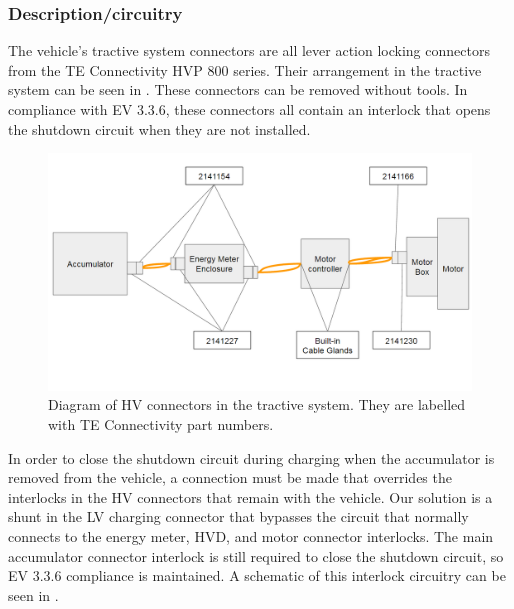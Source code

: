 \documentclass{article}
\begin{document}
\subsubsection{Description/circuitry}
The vehicle's tractive system connectors are all lever action locking connectors from the TE Connectivity HVP 800 series. Their arrangement in the tractive system can be seen in . These connectors can be removed without tools. In compliance with EV 3.3.6, these connectors all contain an interlock that opens the shutdown circuit when they are not installed. 

  \begin{figure}[H]
        \centering
        \includegraphics[width=.75\textwidth]{HV_connector_diagram.png}
        \caption{Diagram of HV connectors in the tractive system. They are labelled with TE Connectivity part numbers.}
        \label{fig:HV_connector_diagram}
  \end{figure}

In order to close the shutdown circuit during charging when the accumulator is removed from the vehicle, a connection must be made that overrides the interlocks in the HV connectors that remain with the vehicle. Our solution is a shunt in the LV charging connector that bypasses the circuit that normally connects to the energy meter, HVD, and motor connector interlocks. The main accumulator connector interlock is still required to close the shutdown circuit, so EV 3.3.6 compliance is maintained. A schematic of this interlock circuitry can be seen in .
\end{document}
